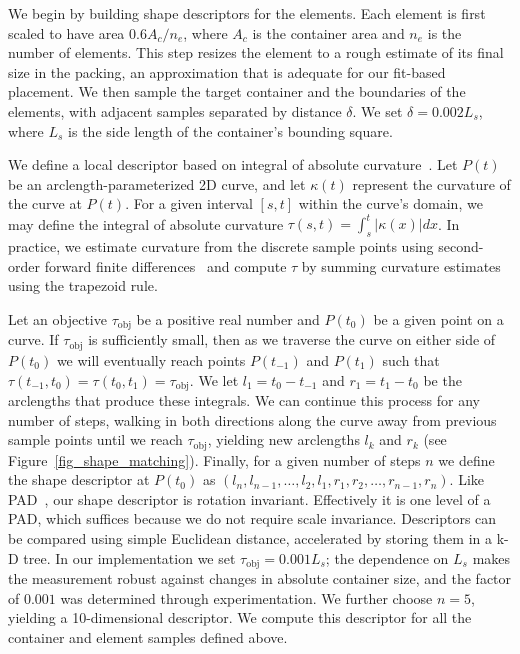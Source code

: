 We begin by building shape descriptors for the elements.  
Each element is first scaled to have area
$0.6A_c/n_e$, where $A_c$ is the container area and $n_e$ is the 
number of elements.  This step resizes the element to a rough estimate
of its final size in the packing, an approximation that is adequate
for our fit-based placement.  We then sample the target container and
the boundaries of the elements, with adjacent samples separated by
distance $\delta$.  We set $\delta=0.002L_s$, where $L_s$ is the
side length of the container's bounding square.

We define a local descriptor based on integral of absolute curvature~\cite{Cui2009,Kwan2016}.
Let $P(t)$ be an arclength-parameterized 2D curve, and let $\kappa(t)$ represent the curvature of the curve at $P(t)$.  For a given interval $[s,t]$ within the curve's domain, we may define the integral of absolute curvature
$\tau(s,t) = \int_{s}^{t} | \kappa(x) | dx$.
In practice, we estimate curvature from the discrete sample points
using second-order forward finite differences~\cite{Banchoff2015} 
and compute $\tau$ by summing curvature estimates using the trapezoid rule.

Let an objective $\tau_\mathrm{obj}$ be a positive real number and $P(t_0)$ be a given point on a curve.  If $\tau_\mathrm{obj}$ is sufficiently small, then as we traverse the curve on either side of $P(t_0)$ we will eventually reach points $P(t_{-1})$ and $P(t_1)$ such that $\tau(t_{-1},t_0)=\tau(t_0,t_1)=\tau_\mathrm{obj}$.  We let $l_1=t_0-t_{-1}$ and $r_1=t_1-t_0$ be the arclengths that produce these integrals.  We can continue this process for any number of steps, walking in both directions along the curve away from previous sample points until we reach $\tau_\mathrm{obj}$, yielding new arclengths $l_k$ and $r_k$ (see Figure~\ref{fig_shape_matching}).  Finally, for a given number of steps $n$ we define the shape descriptor at $P(t_0)$ as
$(l_n, l_{n-1}, \ldots, l_2, l_1, r_1, r_2, \ldots, r_{n-1}, r_n)$.
Like PAD~\cite{Kwan2016}, our shape descriptor is rotation 
invariant.  Effectively it is one level of a PAD, which suffices because
we do not require scale invariance.
Descriptors can be compared using simple Euclidean distance, accelerated
by storing them in a k-D tree.
In our implementation we set $\tau_\mathrm{obj}=0.001L_s$; the dependence
on $L_s$ makes the measurement robust against changes in absolute container
size, and the factor of $0.001$ was determined through experimentation.
We further choose $n=5$, yielding a 10-dimensional descriptor. We compute
this descriptor for all the container and element samples defined above.

